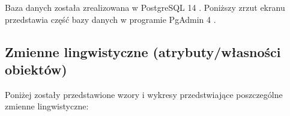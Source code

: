 \documentclass{classrep}
\begin{document}
Baza danych została zrealizowana w PostgreSQL 14 \cite{postgres}. Poniższy zrzut ekranu przedstawia część bazy danych w programie PgAdmin 4 \cite{pgadmin}.





\subsection{Zmienne lingwistyczne (atrybuty/własności obiektów)}

Poniżej zostały przedstawione wzory i wykresy przedstwiające poszczególne zmienne lingwistyczne:
\end{document}
